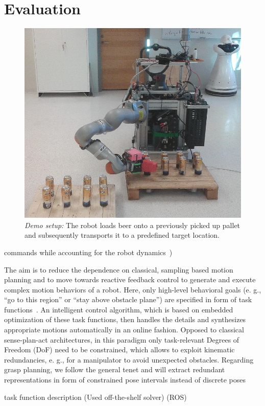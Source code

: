 \section{Evaluation}
\label{sec:eval}
%
\begin{figure}[t!]
\begin{center}
\includegraphics[width =1\linewidth]{figs/demo}
\caption{\textit{Demo setup:} The robot loads beer onto a previously picked up pallet and
  subsequently transports it to a predefined target location.}
\label{fig:demo_setup}
\vspace{-0.65cm}
\end{center}
\end{figure}
%


commands while accounting for the robot dynamics~\cite{Saab13})

The aim is to reduce the dependence on classical, sampling based motion planning and to move towards
reactive feedback control to generate and execute complex motion behaviors of a robot.  Here, only
high-level behavioral goals (e. g., “go to this region” or “stay above obstacle plane”) are
specified in form of task functions~\cite{Sams91}. An intelligent control algorithm, which is based
on embedded optimization of these task functions, then handles the details and synthesizes
appropriate motions automatically in an online fashion. Opposed to classical sense-plan-act
architectures, in this paradigm only task-relevant Degrees of Freedom (DoF) need to be constrained,
which allows to exploit kinematic redundancies, e. g., for a manipulator to avoid unexpected
obstacles. Regarding grasp planning, we follow the general tenet and will extract redundant
representations in form of constrained pose intervals instead of discrete poses


\cite{Kano09} task function description
\cite{Guro15}(Used off-the-shelf solver)
\cite{Quig09}(ROS)